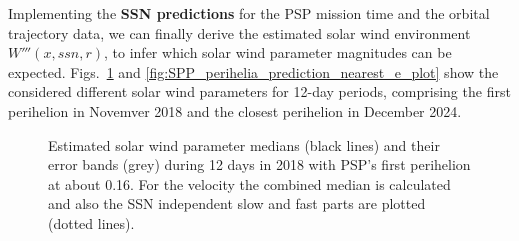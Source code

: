 Implementing the \textbf{SSN predictions} for the PSP mission time and the orbital trajectory data, we can finally derive the estimated solar wind environment $W'''(x,ssn,r)$, to infer which solar wind parameter magnitudes can be expected. Figs.~\ref{fig:SPP_perihelia_prediction_e_plot} and \ref{fig:SPP_perihelia_prediction_nearest_e_plot} show the considered different solar wind parameters for 12-day periods, comprising the first perihelion in Novemver 2018 and the closest perihelion in December 2024.
\begin{figure}
	\caption{Estimated solar wind parameter medians (black lines) and their error bands (grey) during 12 days in 2018 with PSP's first perihelion at about \SI{0.16}{\au}. For the velocity the combined median is calculated and also the SSN independent slow and fast parts are plotted (dotted lines).}
	\label{fig:SPP_perihelia_prediction_e_plot}
\end{figure}
